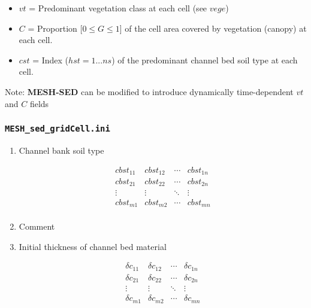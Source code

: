 \documentclass[12pt, letterpaper]{article}
\newcommand{\ms}{\textbf{MESH-SED} }
\newcounter{ResumeEnumerate}
\begin{document}
{\scriptsize 
\begin{itemize}[label={}]
\item $vt$ = Predominant vegetation class at each cell (see $vege$)
\item $C$ = Proportion [$0\leq G \leq 1$] of the cell area covered by vegetation (canopy) at each cell. 
\item $cst$ = Index ($hst = 1 ... ns$) of the predominant channel bed soil type at each cell.
\end{itemize}
Note: \ms can be modified to introduce dynamically time-dependent $vt$ and $C$ fields
}

\subsubsection{\texttt{MESH\_sed\_gridCell.ini}}
{\tiny
\begin{enumerate}[start=\numexpr\value{ResumeEnumerate}+1, label=Line \arabic*]\itemsep0em 
\item Channel bank soil type\\[-2.7em]
\begin{minipage}[t]{0.1\linewidth}
\begin{flushright}
$$
\begin{matrix} 
cbst_{11} & cbst_{12} & \cdots & cbst_{1n} \\
cbst_{21} & cbst_{22} & \cdots & cbst_{2n} \\
\vdots & \vdots & \ddots & \vdots \\
cbst_{m1} & cbst_{m2} & \cdots & cbst_{mn}\\
\end{matrix}
$$
\end{flushright}
\end{minipage}

\item Comment
\item Initial thickness of channel bed material \\[-2.7em]
\begin{minipage}[t]{0.1\linewidth}
\begin{flushright}
$$
\begin{matrix} 
\delta c_{11} & \delta c_{12} & \cdots & \delta c_{1n} \\
\delta c_{21} & \delta c_{22} & \cdots & \delta c_{2n} \\
\vdots & \vdots & \ddots & \vdots \\
\delta c_{m1} & \delta c_{m2} & \cdots & \delta c_{mn} \\
\end{matrix}
$$
\end{flushright}
\end{minipage}
\end{enumerate}
}
\end{document}

